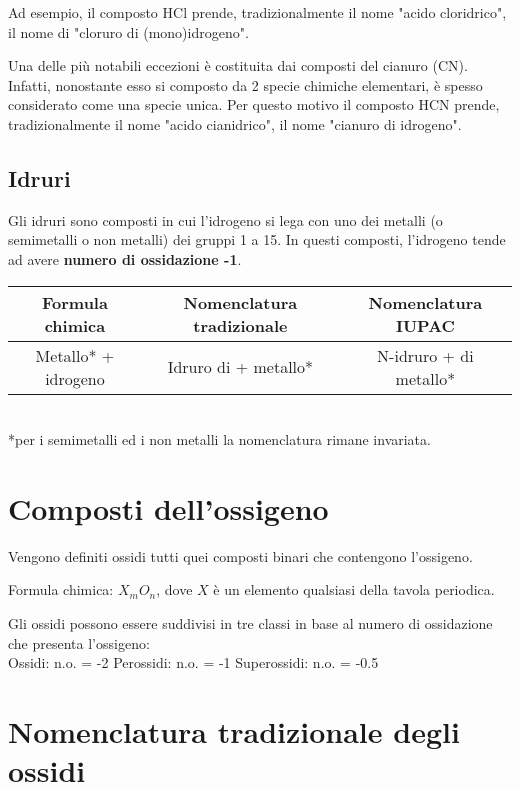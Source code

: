 \documentclass[10pt,a4paper]{article}
\begin{document}
 	Ad esempio, il composto HCl prende, tradizionalmente il nome "acido cloridrico", il nome di "cloruro di (mono)idrogeno".
 	
 	Una delle più notabili eccezioni è costituita dai composti del cianuro (CN). Infatti, nonostante esso si composto da 2 specie chimiche elementari, è spesso considerato come una specie unica. Per questo motivo il composto HCN prende, tradizionalmente il nome "acido cianidrico", il nome "cianuro di idrogeno".
 	
 \subsection*{Idruri}
 
	Gli idruri sono composti in cui l'idrogeno si lega con uno dei metalli (o semimetalli o non metalli) dei gruppi 1 a 15. In questi composti, l'idrogeno tende ad avere \textbf{numero di ossidazione -1}.\\
	
	\begin{tabular}{|c|c|c|}
		\hline
		Formula chimica & Nomenclatura tradizionale & Nomenclatura IUPAC \\
		\hline
		Metallo*  + idrogeno & Idruro di + metallo*  & N-idruro + di metallo*  \\
		\hline
	\end{tabular}\\
	
	*per i semimetalli ed i non metalli la nomenclatura rimane invariata.
	
\section*{Composti dell'ossigeno}

	Vengono definiti ossidi tutti quei composti binari che contengono l'ossigeno.
	
	Formula chimica: $X_mO_n$, dove $X$ è un elemento qualsiasi della tavola periodica.
	
	Gli ossidi possono essere suddivisi in tre classi in base al numero di ossidazione che presenta l'ossigeno:\\
	
	Ossidi: n.o. = -2 \hfill
	Perossidi: n.o. = -1\hfill
	Superossidi: n.o. = -0.5
		
	
\section*{Nomenclatura tradizionale degli ossidi}
\end{document}
